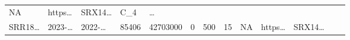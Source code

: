 \documentclass[
]{article}
\begin{document}
\begin{longtable}[]{@{}lllllllllllll@{}}
\begin{minipage}[t]{0.05\columnwidth}
NA\strut
\end{minipage} & \begin{minipage}[t]{0.05\columnwidth}\raggedright
https\ldots{}\strut
\end{minipage} & \begin{minipage}[t]{0.05\columnwidth}\raggedright
SRX14\ldots{}\strut
\end{minipage} & \begin{minipage}[t]{0.08\columnwidth}\raggedright
C\_4\strut
\end{minipage} & \begin{minipage}[t]{0.02\columnwidth}\raggedright
\ldots{}\strut
\end{minipage}\tabularnewline
\begin{minipage}[t]{0.05\columnwidth}\raggedright
SRR18\ldots{}\strut
\end{minipage} & \begin{minipage}[t]{0.05\columnwidth}\raggedright
2023-\ldots{}\strut
\end{minipage} & \begin{minipage}[t]{0.05\columnwidth}\raggedright
2022-\ldots{}\strut
\end{minipage} & \begin{minipage}[t]{0.04\columnwidth}\raggedright
85406\strut
\end{minipage} & \begin{minipage}[t]{0.05\columnwidth}\raggedright
42703000\strut
\end{minipage} & \begin{minipage}[t]{0.05\columnwidth}\raggedright
0\strut
\end{minipage} & \begin{minipage}[t]{0.05\columnwidth}\raggedright
500\strut
\end{minipage} & \begin{minipage}[t]{0.05\columnwidth}\raggedright
15\strut
\end{minipage} & \begin{minipage}[t]{0.05\columnwidth}\raggedright
NA\strut
\end{minipage} & \begin{minipage}[t]{0.05\columnwidth}\raggedright
https\ldots{}\strut
\end{minipage} & \begin{minipage}[t]{0.05\columnwidth}\raggedright
SRX14\ldots{}\strut
\end{minipage} & \begin{minipage}[t]{0.08\columnwidth}\raggedright

\end{minipage}
\end{longtable}
\end{document}
